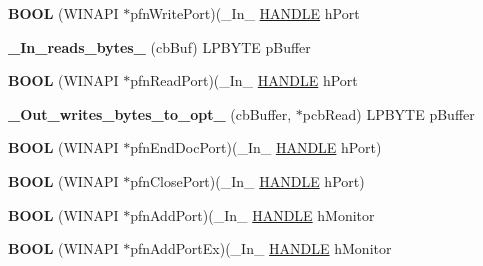\begin{DoxyCompactItemize}
\item 
\mbox{\label{struct___m_o_n_i_t_o_r2_ab74269e6641c078ce1a9254ec1b6fc38}} 
{\bfseries B\+O\+OL} (W\+I\+N\+A\+PI $\ast$pfn\+Write\+Port)(\+\_\+\+In\+\_\+ \hyperlink{interfacevoid}{H\+A\+N\+D\+LE} h\+Port
\item 
\mbox{\label{struct___m_o_n_i_t_o_r2_a07e7f4a7214e8a162d0978f61656afee}} 
{\bfseries \+\_\+\+In\+\_\+reads\+\_\+bytes\+\_\+} (cb\+Buf) L\+P\+B\+Y\+TE p\+Buffer
\item 
\mbox{\label{struct___m_o_n_i_t_o_r2_a003b1f4a12bb253ed5a7143798dc05fc}} 
{\bfseries B\+O\+OL} (W\+I\+N\+A\+PI $\ast$pfn\+Read\+Port)(\+\_\+\+In\+\_\+ \hyperlink{interfacevoid}{H\+A\+N\+D\+LE} h\+Port
\item 
\mbox{\label{struct___m_o_n_i_t_o_r2_a8c3ed8b7bb443b3bc5515a17eb9e6a82}} 
{\bfseries \+\_\+\+Out\+\_\+writes\+\_\+bytes\+\_\+to\+\_\+opt\+\_\+} (cb\+Buffer, $\ast$pcb\+Read) L\+P\+B\+Y\+TE p\+Buffer
\item 
\mbox{\label{struct___m_o_n_i_t_o_r2_a4522f6b4dfb06d3c795428391a67410d}} 
{\bfseries B\+O\+OL} (W\+I\+N\+A\+PI $\ast$pfn\+End\+Doc\+Port)(\+\_\+\+In\+\_\+ \hyperlink{interfacevoid}{H\+A\+N\+D\+LE} h\+Port)
\item 
\mbox{\label{struct___m_o_n_i_t_o_r2_aed37eae4f5e66edeb239194b31051ae1}} 
{\bfseries B\+O\+OL} (W\+I\+N\+A\+PI $\ast$pfn\+Close\+Port)(\+\_\+\+In\+\_\+ \hyperlink{interfacevoid}{H\+A\+N\+D\+LE} h\+Port)
\item 
\mbox{\label{struct___m_o_n_i_t_o_r2_a8da0a0b3d9c396386623b36491c2dd91}} 
{\bfseries B\+O\+OL} (W\+I\+N\+A\+PI $\ast$pfn\+Add\+Port)(\+\_\+\+In\+\_\+ \hyperlink{interfacevoid}{H\+A\+N\+D\+LE} h\+Monitor
\item 
\mbox{\label{struct___m_o_n_i_t_o_r2_ae1c872ab6f1bfeca03549c7557101469}} 
{\bfseries B\+O\+OL} (W\+I\+N\+A\+PI $\ast$pfn\+Add\+Port\+Ex)(\+\_\+\+In\+\_\+ \hyperlink{interfacevoid}{H\+A\+N\+D\+LE} h\+Monitor
\item 
\mbox{\label{struct___m_o_n_i_t_o_r2_a8be96b37e4a4771111dfe9d9999bcefe}} 

\end{DoxyCompactItemize}
